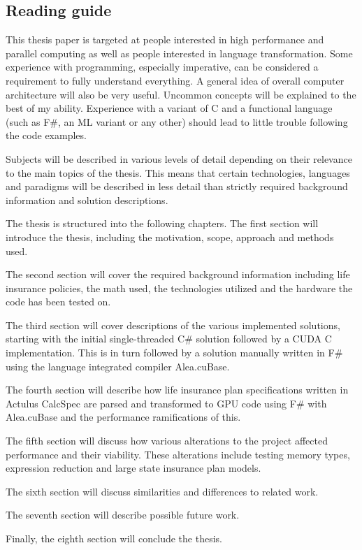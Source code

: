 \subsection{Reading guide}
This thesis paper is targeted at people interested in high performance and parallel computing as well as people interested in language transformation. 
Some experience with programming, especially imperative, can be considered a requirement to fully understand everything. 
A general idea of overall computer architecture will also be very useful. 
Uncommon concepts will be explained to the best of my ability. 
Experience with a variant of C and a functional language (such as F\#, an ML variant or any other) should lead to little trouble following the code examples.

Subjects will be described in various levels of detail depending on their relevance to the main topics of the thesis.
This means that certain technologies, languages and paradigms will be described in less detail than strictly required background information and solution descriptions.

The thesis is structured into the following chapters.
The first section will introduce the thesis, including the motivation, scope, approach and methods used.

The second section will cover the required background information including life insurance policies, the math used, the technologies utilized and the hardware the code has been tested on.

The third section will cover descriptions of the various implemented solutions, starting with the initial single-threaded C\# solution followed by a CUDA C implementation. 
This is in turn followed by a solution manually written in F\# using the language integrated compiler Alea.cuBase.

The fourth section will describe how life insurance plan specifications written in Actulus CalcSpec are parsed and transformed to GPU code using F\# with Alea.cuBase and the performance ramifications of this.

The fifth section will discuss how various alterations to the project affected performance and their viability. 
These alterations include testing memory types, expression reduction and large state insurance plan models.

The sixth section will discuss similarities and differences to related work.

The seventh section will describe possible future work.

Finally, the eighth section will conclude the thesis.